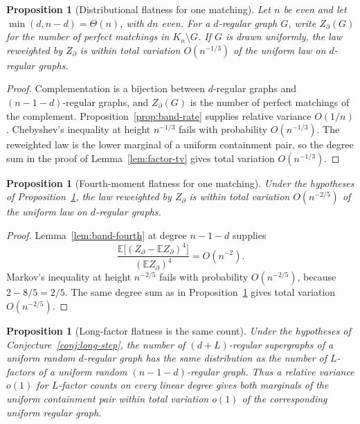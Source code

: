 \documentclass[11pt]{article}
\newtheorem{proposition}[theorem]{Proposition}
\newcommand{\EE}{\mathbb{E}}
\begin{document}
\begin{proposition}[Distributional flatness for one matching]
\label{prop:flat-one}
Let \(n\) be even and let \(\min(d,n-d)=\Theta(n)\), with \(dn\) even.
For a \(d\)-regular graph \(G\), write \(Z_\partial(G)\) for the number of perfect matchings in \(K_n\setminus G\).
If \(G\) is drawn uniformly, the law reweighted by \(Z_\partial\) is within total variation \(O(n^{-1/3})\) of the uniform law on \(d\)-regular graphs.
\end{proposition}

\begin{proof}
Complementation is a bijection between \(d\)-regular graphs and \((n-1-d)\)-regular graphs, and \(Z_\partial(G)\) is the number of perfect matchings of the complement.
Proposition~\ref{prop:band-rate} supplies relative variance \(O(1/n)\).
Chebyshev's inequality at height \(n^{-1/3}\) fails with probability \(O(n^{-1/3})\).
The reweighted law is the lower marginal of a uniform containment pair, so the degree sum in the proof of Lemma~\ref{lem:factor-tv} gives total variation \(O(n^{-1/3})\).
\end{proof}

\begin{proposition}[Fourth-moment flatness for one matching]
\label{prop:flat-fourth}
Under the hypotheses of Proposition~\ref{prop:flat-one}, the law reweighted by \(Z_\partial\) is within total variation \(O(n^{-2/5})\) of the uniform law on \(d\)-regular graphs.
\end{proposition}

\begin{proof}
Lemma~\ref{lem:band-fourth} at degree \(n-1-d\) supplies
\[
\frac{\EE\bigl[(Z_\partial-\EE Z_\partial)^{4}\bigr]}{(\EE Z_\partial)^{4}}=O(n^{-2}).
\]
Markov's inequality at height \(n^{-2/5}\) fails with probability \(O(n^{-2/5})\), because \(2-8/5=2/5\).
The same degree sum as in Proposition~\ref{prop:flat-one} gives total variation \(O(n^{-2/5})\).
\end{proof}

\begin{proposition}[Long-factor flatness is the same count]
\label{prop:flat-same}
Under the hypotheses of Conjecture~\ref{conj:long-step}, the number of \((d+L)\)-regular supergraphs of a uniform random \(d\)-regular graph has the same distribution as the number of \(L\)-factors of a uniform random \((n-1-d)\)-regular graph.
Thus a relative variance \(o(1)\) for \(L\)-factor counts on every linear degree gives both marginals of the uniform containment pair within total variation \(o(1)\) of the corresponding uniform regular graph.
\end{proposition}
\end{document}
